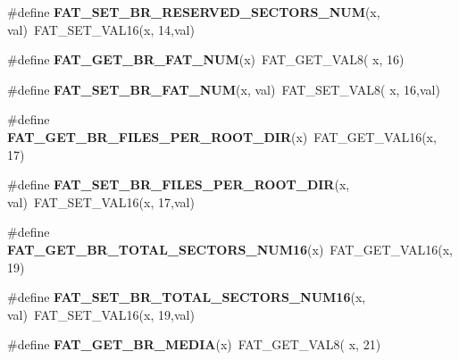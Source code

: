 \begin{DoxyCompactItemize}
\#define {\bfseries F\+A\+T\+\_\+\+S\+E\+T\+\_\+\+B\+R\+\_\+\+R\+E\+S\+E\+R\+V\+E\+D\+\_\+\+S\+E\+C\+T\+O\+R\+S\+\_\+\+N\+UM}(x,  val)~F\+A\+T\+\_\+\+S\+E\+T\+\_\+\+V\+A\+L16(x, 14,val)
\item 
\mbox{\label{group__libfs__dosfs_ga50b1dbdf4c11d9a9f2dd5f552bd92458}} 
\#define {\bfseries F\+A\+T\+\_\+\+G\+E\+T\+\_\+\+B\+R\+\_\+\+F\+A\+T\+\_\+\+N\+UM}(x)~F\+A\+T\+\_\+\+G\+E\+T\+\_\+\+V\+A\+L8( x, 16)
\item 
\mbox{\label{group__libfs__dosfs_ga76eef22ce59a0f78046fc90bef136283}} 
\#define {\bfseries F\+A\+T\+\_\+\+S\+E\+T\+\_\+\+B\+R\+\_\+\+F\+A\+T\+\_\+\+N\+UM}(x,  val)~F\+A\+T\+\_\+\+S\+E\+T\+\_\+\+V\+A\+L8( x, 16,val)
\item 
\mbox{\label{group__libfs__dosfs_ga8997c14e650901a36fd9686c26b02599}} 
\#define {\bfseries F\+A\+T\+\_\+\+G\+E\+T\+\_\+\+B\+R\+\_\+\+F\+I\+L\+E\+S\+\_\+\+P\+E\+R\+\_\+\+R\+O\+O\+T\+\_\+\+D\+IR}(x)~F\+A\+T\+\_\+\+G\+E\+T\+\_\+\+V\+A\+L16(x, 17)
\item 
\mbox{\label{group__libfs__dosfs_ga4590a4a2030ab17d1a91e9553b407e92}} 
\#define {\bfseries F\+A\+T\+\_\+\+S\+E\+T\+\_\+\+B\+R\+\_\+\+F\+I\+L\+E\+S\+\_\+\+P\+E\+R\+\_\+\+R\+O\+O\+T\+\_\+\+D\+IR}(x,  val)~F\+A\+T\+\_\+\+S\+E\+T\+\_\+\+V\+A\+L16(x, 17,val)
\item 
\mbox{\label{group__libfs__dosfs_gaacf178504ba88d8e213c5c27b53905dc}} 
\#define {\bfseries F\+A\+T\+\_\+\+G\+E\+T\+\_\+\+B\+R\+\_\+\+T\+O\+T\+A\+L\+\_\+\+S\+E\+C\+T\+O\+R\+S\+\_\+\+N\+U\+M16}(x)~F\+A\+T\+\_\+\+G\+E\+T\+\_\+\+V\+A\+L16(x, 19)
\item 
\mbox{\label{group__libfs__dosfs_gafafc39dfabb4e8013f2f73347ff277e1}} 
\#define {\bfseries F\+A\+T\+\_\+\+S\+E\+T\+\_\+\+B\+R\+\_\+\+T\+O\+T\+A\+L\+\_\+\+S\+E\+C\+T\+O\+R\+S\+\_\+\+N\+U\+M16}(x,  val)~F\+A\+T\+\_\+\+S\+E\+T\+\_\+\+V\+A\+L16(x, 19,val)
\item 
\mbox{\label{group__libfs__dosfs_ga0e1d4aba0cf83b1398f331995ec321e8}} 
\#define {\bfseries F\+A\+T\+\_\+\+G\+E\+T\+\_\+\+B\+R\+\_\+\+M\+E\+D\+IA}(x)~F\+A\+T\+\_\+\+G\+E\+T\+\_\+\+V\+A\+L8( x, 21)
\item 

\end{DoxyCompactItemize}
